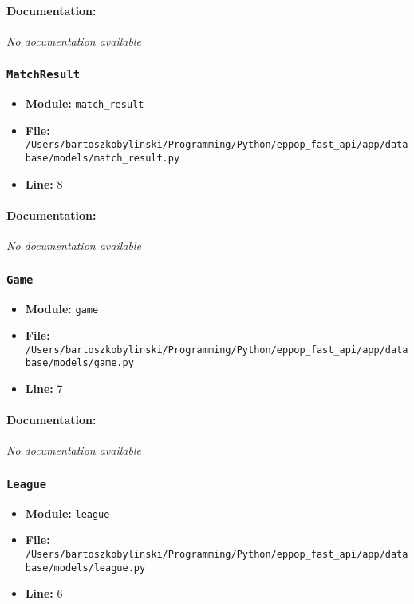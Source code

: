\documentclass[11pt,a4paper]{article}
\begin{document}
\paragraph{Documentation:} \textit{No documentation available}


\vspace{1em}
\subsubsection{\texttt{MatchResult}}

\begin{itemize}
    \item \textbf{Module:} \texttt{match\_result}
    \item \textbf{File:} \texttt{/Users/bartoszkobylinski/Programming/Python/eppop\_fast\_api/app/database/models/match\_result.py}
    \item \textbf{Line:} 8
\end{itemize}

\paragraph{Documentation:} \textit{No documentation available}


\vspace{1em}
\subsubsection{\texttt{Game}}

\begin{itemize}
    \item \textbf{Module:} \texttt{game}
    \item \textbf{File:} \texttt{/Users/bartoszkobylinski/Programming/Python/eppop\_fast\_api/app/database/models/game.py}
    \item \textbf{Line:} 7
\end{itemize}

\paragraph{Documentation:} \textit{No documentation available}


\vspace{1em}
\subsubsection{\texttt{League}}

\begin{itemize}
    \item \textbf{Module:} \texttt{league}
    \item \textbf{File:} \texttt{/Users/bartoszkobylinski/Programming/Python/eppop\_fast\_api/app/database/models/league.py}
    \item \textbf{Line:} 6
\end{itemize}
\end{document}

